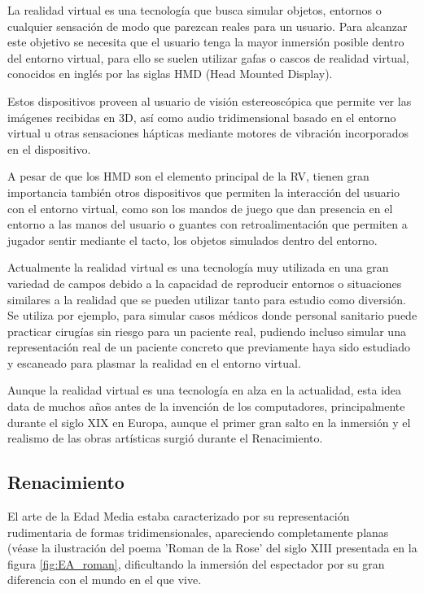 La realidad virtual es una tecnología que busca simular objetos, entornos o cualquier sensación de modo que parezcan reales para un usuario. Para alcanzar este objetivo se necesita que el usuario tenga la mayor inmersión posible dentro del entorno virtual, para ello se suelen utilizar gafas o cascos de realidad virtual, conocidos en inglés por las siglas HMD (Head Mounted Display).

Estos dispositivos proveen al usuario de visión estereoscópica que permite ver las imágenes recibidas en 3D, así como audio tridimensional basado en el entorno virtual u otras sensaciones hápticas mediante motores de vibración incorporados en el dispositivo. 

A pesar de que los HMD son el elemento principal de la RV, tienen gran importancia también otros dispositivos que permiten la interacción del usuario con el entorno virtual, como son los mandos de juego que dan presencia en el entorno a las manos del usuario o guantes con retroalimentación que permiten a jugador sentir mediante el tacto, los objetos simulados dentro del entorno.

Actualmente la realidad virtual es una tecnología muy utilizada en una gran variedad de campos debido a la capacidad de reproducir entornos o situaciones similares a la realidad que se pueden utilizar tanto para estudio como diversión. Se utiliza por ejemplo, para simular casos médicos donde personal sanitario puede practicar cirugías sin riesgo para un paciente real, pudiendo incluso simular una representación real de un paciente concreto que previamente haya sido estudiado y escaneado para plasmar la realidad en el entorno virtual.  \cite{EA_vr_sanidad}

Aunque la realidad virtual es una tecnología en alza en la actualidad, esta idea data de muchos años antes de la invención de los computadores, principalmente durante el siglo XIX en Europa, aunque el primer gran salto en la inmersión y el realismo de las obras artísticas surgió durante el Renacimiento.




\subsection{Renacimiento}

El arte de la Edad Media estaba caracterizado por su representación rudimentaria de formas tridimensionales, apareciendo completamente planas (véase la ilustración del poema 'Roman de la Rose' del siglo XIII presentada en la figura \ref{fig:EA_roman}, dificultando la inmersión del espectador por su gran diferencia con el mundo en el que vive.

